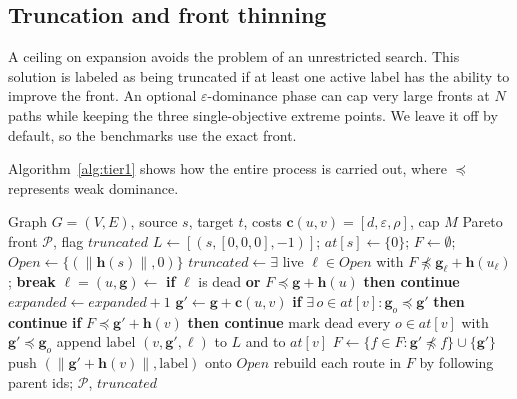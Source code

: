 \subsection{Truncation and front thinning}

A ceiling on expansion avoids the problem of an unrestricted search. This solution is
labeled as being truncated if at least one active label has the ability to improve the
front. An optional $\varepsilon$-dominance phase can cap very large fronts at $N$ paths while keeping the three single-objective extreme points. We leave it off by default, so the benchmarks use the
exact front.

Algorithm~\ref{alg:tier1} shows how the entire process is carried out, where $\preceq$
represents weak dominance.

\begin{algorithm}[p]
\caption{NAMOA* with a label table (Tier~1)}\label{alg:tier1}
\begin{algorithmic}[1]
\Require Graph $G=(V,E)$, source $s$, target $t$, costs $\mathbf{c}(u,v)=[d,\varepsilon,\rho]$, cap $M$
\Ensure Pareto front $\mathcal{P}$, flag $\mathit{truncated}$
\State $L \gets [(s, [0,0,0], -1)]$; $\mathit{at}[s] \gets \{0\}$; $F \gets \emptyset$; $\mathit{Open} \gets \{(\lVert\mathbf{h}(s)\rVert, 0)\}$
    \State $\mathit{truncated} \gets \exists$ live $\ell \in \mathit{Open}$ with $F \not\preceq \mathbf{g}_\ell + \mathbf{h}(u_\ell)$; \textbf{break}
  \EndIf
  \State $\ell = (u, \mathbf{g}) \gets$ 
  \State \textbf{if} $\ell$ is dead \textbf{or} $F \preceq \mathbf{g} + \mathbf{h}(u)$ \textbf{then continue}
  \State $\mathit{expanded} \gets \mathit{expanded} + 1$
    \State $\mathbf{g}' \gets \mathbf{g} + \mathbf{c}(u,v)$
    \State \textbf{if} $\exists\, o \in \mathit{at}[v] : \mathbf{g}_o \preceq \mathbf{g}'$ \textbf{then continue} 
    \State \textbf{if} $F \preceq \mathbf{g}' + \mathbf{h}(v)$ \textbf{then continue} 
    \State mark dead every $o \in \mathit{at}[v]$ with $\mathbf{g}' \preceq \mathbf{g}_o$
    \State append label $(v, \mathbf{g}', \ell)$ to $L$ and to $\mathit{at}[v]$
      \State $F \gets \{f \in F : \mathbf{g}' \not\preceq f\} \cup \{\mathbf{g}'\}$
    \Else
      \State push $(\lVert\mathbf{g}' + \mathbf{h}(v)\rVert, \text{label})$ onto $\mathit{Open}$
    \EndIf
  \EndFor
\EndWhile
\State rebuild each route in $F$ by following parent ids; \Return $\mathcal{P}$, $\mathit{truncated}$
\end{algorithmic}
\end{algorithm}

